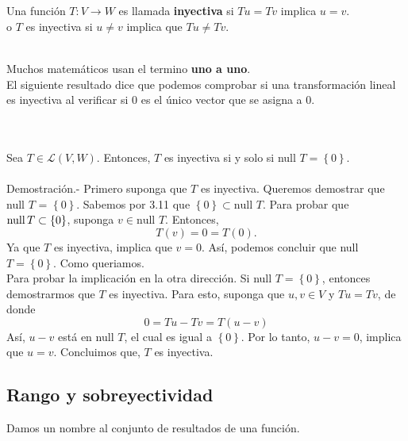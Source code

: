 \begin{mydef}[Inyectiva]\,\\\\
    Una función $T:V\to W$ es llamada \textbf{inyectiva} si $Tu=Tv$ implica $u=v$.\\

    o $T$ es inyectiva si $u\neq v$ implica que $Tu\neq Tv$.\\\\
\end{mydef}

Muchos matemáticos usan el termino \textbf{uno a uno}.\\

El siguiente resultado dice que podemos comprobar si una transformación lineal es inyectiva al verificar si $0$ es el único vector que se asigna a $0$.

\begin{myteo}\,\\\\
    Sea $T\in \mathcal{L}(V,W)$. Entonces, $T$ es inyectiva si y solo si null $T=\left\{0\right\}$.\\\\
	Demostración.-\; Primero suponga que $T$ es inyectiva. Queremos demostrar que null $T$ = $\left\{0\right\}$. Sabemos por 3.11 que $\left\{0\right\}\subset \mbox{null }T$. Para probar que $\operatorname{null} T \subset \left\{0\right\}$, suponga $v\in \mbox{null }T$. Entonces,
	$$T(v)=0=T(0).$$
	Ya que $T$ es inyectiva, implica que $v=0$. Así, podemos concluir que null $T=\left\{0\right\}$. Como queriamos.\\

	Para probar la implicación en la otra dirección. Si null $T=\left\{0\right\}$, entonces demostrarmos que $T$ es inyectiva. Para esto, suponga que $u,v\in V$ y $Tu=Tv$, de donde
	$$0=Tu-Tv=T(u-v)$$
	Así, $u-v$ está en null $T$, el cual es igual a $\left\{0\right\}$. Por lo tanto, $u-v=0$, implica que $u=v$. Concluimos que, $T$ es inyectiva.
\end{myteo}
\vspace{.5cm}

\subsection*{Rango y sobreyectividad}

Damos un nombre al conjunto de resultados de una función.

